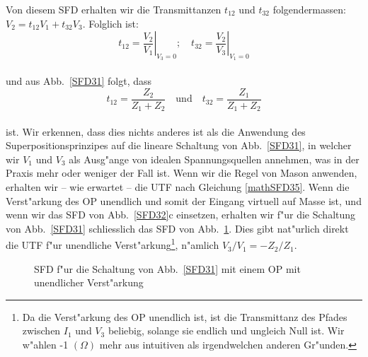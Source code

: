 \nit Von diesem SFD erhalten wir die Transmittanzen $t_{12}$ und $t_{32}$
folgendermassen: $V_2=t_{12}V_1+t_{32}V_3$. Folglich ist:
\begin{equation*}
 t_{12} =  \left.\frac{V_2}{V_1}\right |_{V_3=0}; \quad t_{32} =  \left.\frac{V_2}{V_3}\right |_{V_1=0}
\end{equation*}\\
\nit und aus Abb.~\ref{SFD31} folgt, dass
\begin{equation*}
 t_{12} =  \frac{Z_2}{Z_1+Z_2}\quad \mbox{und}\quad t_{32} = \frac{Z_1}{Z_1+Z_2}
\end{equation*}\\
\nit ist. Wir erkennen, dass dies nichts anderes ist als die Anwendung
des Superpositionsprinzipes auf die lineare
Schaltung von Abb.~\ref{SFD31}, in welcher wir $V_1$ und $V_3$ als
Ausg"ange von idealen Spannungsquellen
annehmen, was in der Praxis mehr oder weniger der Fall ist. Wenn wir
die Regel von Mason anwenden, erhalten wir -- wie
erwartet -- die UTF nach Gleichung \ref{mathSFD35}.  Wenn die
Verst"arkung des OP unendlich und somit der Eingang
virtuell auf Masse ist, und wenn wir das
SFD von Abb.~\ref{SFD32}c einsetzen, erhalten wir f"ur die Schaltung
von Abb.~\ref{SFD31} schliesslich das SFD von Abb.~\ref{SFD36}. Dies
gibt nat"urlich direkt die UTF f"ur unendliche
Verst"arkung\footnote{Da die Verst"arkung des OP unendlich ist, ist
  die Transmittanz des Pfades zwischen $I_1$ und $V_3$ beliebig,
  solange sie endlich und ungleich Null ist. Wir w"ahlen
  -1 $(\Omega)$ mehr aus intuitiven als irgendwelchen anderen Gr"unden.}, n"amlich $V_3/V_1=-Z_2/Z_1$.\\
\begin{figure}[htb!]
\vspace*{-3mm}\begin{center}
  \caption{SFD
f"ur die Schaltung von Abb.~\ref{SFD31} mit einem OP mit unendlicher
Verst"arkung}\label{SFD36}
\end{center}
\vspace*{-7mm}
\end{figure}
\newpage
